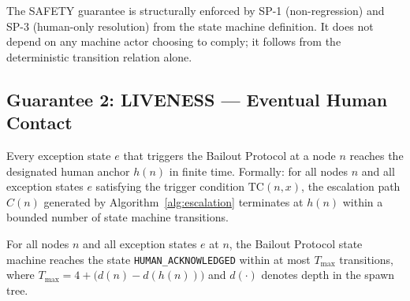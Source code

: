 The SAFETY guarantee is structurally enforced by SP-1 (non-regression) and
SP-3 (human-only resolution) from the state machine definition.  It does not
depend on any machine actor choosing to comply; it follows from the deterministic
transition relation alone.

\subsection{Guarantee 2: LIVENESS --- Eventual Human Contact}
\label{sec:guarantee-liveness}

\begin{definition}
\label{def:liveness}
Every exception state $e$ that triggers the Bailout Protocol at a node $n$
reaches the designated human anchor $h(n)$ in finite time.  Formally: for all
nodes $n$ and all exception states $e$ satisfying the trigger condition
$\text{TC}(n,x)$, the escalation path $C(n)$ generated by
Algorithm~\ref{alg:escalation} terminates at $h(n)$ within a bounded number of
state machine transitions.
\end{definition}

\begin{maintheorem}[LIVENESS]
\label{th:liveness}
For all nodes $n$ and all exception states $e$ at $n$, the Bailout Protocol
state machine reaches the state \texttt{HUMAN\_ACKNOWLEDGED} within at most
$T_{\max}$ transitions, where
$T_{\max} = 4 + \bigl(d(n) - d(h(n))\bigr)$ and $d(\cdot)$ denotes depth in the
spawn tree.
\end{maintheorem}

